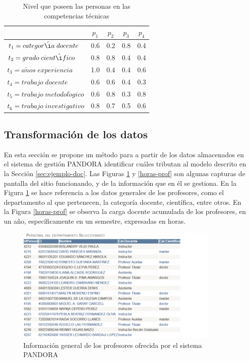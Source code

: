 \begin{table}[H]
	\centering
	\caption{Nivel que poseen las personas en las competencias técnicas}\label{pct-carga}
	\begin{tabular}{|l|c|c|c|c|}
		\hline
		\thead{$F_t(p,t)$} & $p_1$ & $p_2$ & $p_3$ & $p_4$ \\ \hline
		$t_1=categor\acute{\i}a\;docente$  	   &  0.6  &  0.2  &  0.8 &  0.4 \\ \hline
		$t_2=grado\;cient\acute{\i}fico$      &  0.8  &  0.8  &  0.4 &  0.4 \\ \hline
		$t_3=a\tilde{n}os\;experiencia$  	   &  1.0  &  0.4  &  0.4 &  0.6 \\ \hline
		$t_4=trabajo\;docente$     & 0.6 & 0.6 & 0.4 & 0.3 \\ \hline
		$t_5=trabajo\;metodol\acute{o}gico$     & 0.6 & 0.8 & 0.3 & 0.8 \\ \hline
		$t_6=trabajo\;investigativo$     & 0.8 & 0.7 & 0.5 & 0.6 \\ \hline
	\end{tabular}
\end{table}

\subsection{Transformación de los datos}\label{sec:tran_docencia}

 En esta sección se propone un método para a partir de los datos almacenados en el sistema de gestión PANDORA identificar cuáles tributan al modelo descrito en la Sección \ref{sec:ejemplo-doc}. Las Figuras \ref{info-gen-prof} y \ref{horas-prof} son algunas capturas de pantalla del sitio funcionando, y de la información que en él se gestiona. En la Figura \ref{info-gen-prof} se hace referencia a los datos generales de los profesores, como el departamento al que pertenecen, la categoría docente, científica, entre otros. En la Figura \ref{horas-prof} se observa la carga docente acumulada de los profesores, en un año, específicamente en un semestre, expresadas en horas.

\begin{figure} [H]
	\centering
	\includegraphics[width=0.9\textwidth]{figuras/catDocCient.png}
	\caption{Información general de los profesores ofrecida por el sistema PANDORA} \label{info-gen-prof}
\end{figure}

